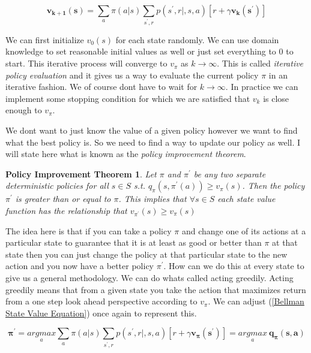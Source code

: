 \begin{equation}\label{Bellman State Value Update Equation}
\mathbf{v_{k + 1}(s)} = \underset{a}{\sum}\pi(a|s)\underset{s^{'},r}{\sum}p(s^{'},r|,s,a)[ r + \gamma \mathbf{v_{k}(s^{'})}]
\end{equation}

We can first initialize $v_{0}(s)$ for each state randomly. We can use domain knowledge to set reasonable initial values as well or just set everything to 0 to start. This iterative process will converge to $v_{\pi}$ as $ k \rightarrow \infty$. This is called \textit{iterative policy evaluation} and it gives us a way to evaluate the current policy $\pi$ in an iterative fashion. We of course dont have to wait for $ k \rightarrow \infty$. In practice we can implement some stopping condition for which we are satisfied that $v_{k}$ is close enough to $v_{\pi}$. 

We dont want to just know the value of a given policy however we want to find what the best policy is. So we need to find a way to update our policy as well. I will state here what is known as the \textit{policy improvement theorem}. 

\newtheorem{remark}{Policy Improvement Theorem}

\begin{remark}\label{Policy Improvement Theorem}
Let $\pi$ and $\pi^{'}$ be any two separate deterministic policies for all $s \in S$ s.t. $q_{\pi}(s,\pi^{'}(a)) \geq v_{\pi}(s)$. Then the policy $\pi^{'}$ is greater than or equal to $\pi$. This implies that $ \forall s \in S$ each state value function has the relationship that $v_{\pi^{'}}(s) \geq v_{\pi}(s)$
\end{remark}

The idea here is that if you can take a policy $\pi$ and change one of its actions at a particular state to guarantee that it is at least as good or better than $\pi$ at that state then you can just change the policy at that particular state to the new action and you now have a better policy $\pi^{'}$. How can we do this at every state to give us a general methodology. We can do whats called acting greedily. Acting greedily means that from a given state you take the action that maximizes return from a one step look ahead perspective according to $v_{\pi}$. We can adjust (\ref{Bellman State Value Equation}) once again to represent this. 

\begin{equation}\label{Greedy Policy}
\mathbf{\pi^{'}} = \underset{a}{argmax}\underset{a}{\sum}\pi(a|s)\underset{s^{'},r}{\sum}p(s^{'},r|,s,a)[ r + \gamma \mathbf{v_{\pi}(s^{'})}] = \underset{a}{argmax} \: \mathbf{q_{\pi}(s,a)}
\end{equation}

